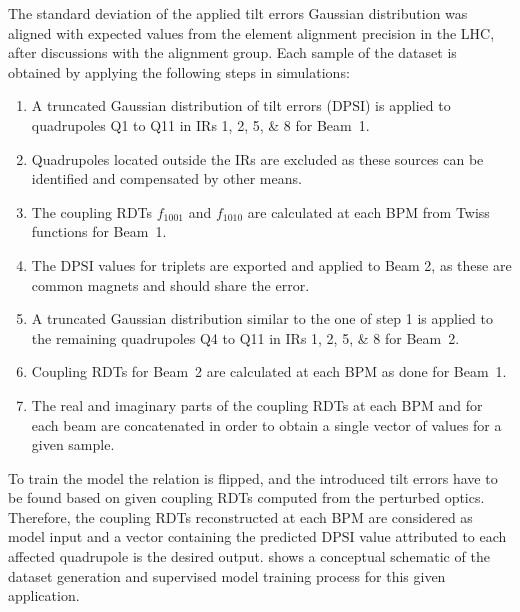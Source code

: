 The standard deviation of the applied tilt errors Gaussian distribution was aligned with expected values from the element alignment precision in the LHC, after discussions with the alignment group.
Each sample of the dataset is obtained by applying the following steps in simulations:
\begin{enumerate}
    \item A truncated Gaussian distribution of tilt errors (\(\mathrm{DPSI}\)) is applied to quadrupoles Q\num{1} to Q\num{11} in IRs \numlist{1;2;5;8} for Beam~\num{1}.
    \item Quadrupoles located outside the IRs are excluded as these sources can be identified and compensated by other means.
    \item The coupling RDTs \(f_{1001}\) and \(f_{1010}\) are calculated at each BPM from Twiss functions for Beam~\num{1}.
    \item The \(\mathrm{DPSI}\) values for triplets are exported and applied to Beam 2, as these are common magnets and should share the error.
    \item A truncated Gaussian distribution similar to the one of step \num{1} is applied to the remaining quadrupoles Q\num{4} to Q\num{11} in IRs \numlist{1;2;5;8} for Beam~\num{2}.
    \item Coupling RDTs for Beam~\num{2} are calculated at each BPM as done for Beam~\num{1}.
    \item The real and imaginary parts of the coupling RDTs at each BPM and for each beam are concatenated in order to obtain a single vector of values for a given sample.
\end{enumerate}

To train the model the relation is flipped, and the introduced tilt errors have to be found based on given coupling RDTs computed from the perturbed optics.
Therefore, the coupling RDTs reconstructed at each BPM are considered as model input and a vector containing the predicted \(\mathrm{DPSI}\) value attributed to each affected quadrupole is the desired output.
 shows a conceptual schematic of the dataset generation and supervised model training process for this given application.


